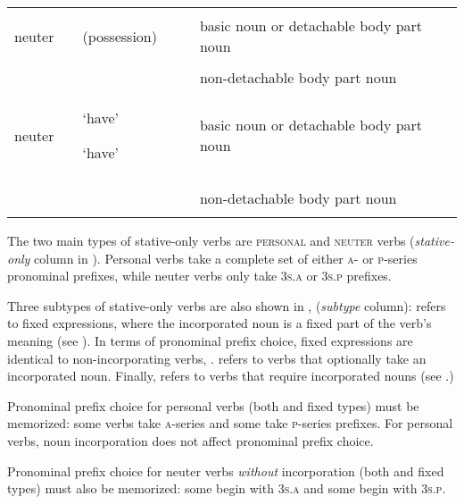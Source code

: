 \begin{table}
\begin{tabularx}{\textwidth}{lcQQQQ}

& 


\\
\addlinespace
\midrule
neuter &  &  

(possession) &   &  & {basic noun or detachable body part noun}\\
&&&&&\\
&  &  &  &  & {non-detachable body part noun}\\
\addlinespace
\midrule
neuter &  &   ‘have’

 ‘have’ &  &  & {basic noun or detachable body part noun}\\
&&&&&\\
&  &  &  &  & {non-detachable body part noun}\\
\lspbottomrule
\end{tabularx}
\end{table}

The two main types of stative-only verbs are \textsc{personal} and \textsc{neuter} verbs (\textit{stative-only} column in ). Personal verbs take a complete set of either \textsc{a}- or \textsc{p}-series pronominal prefixes, while neuter verbs only take  \textsc{3s.a} or  \textsc{3s.p} prefixes.

Three subtypes of stative-only verbs are also shown in , (\textit{subtype} column):  refers to fixed expressions, where the incorporated noun is a fixed part of the verb’s meaning (see ). In terms of pronominal prefix choice,  fixed expressions are identical to non-incorporating verbs, .  refers to verbs that optionally take an incorporated noun. Finally,  refers to verbs that require incorporated nouns (see .)

Pronominal prefix choice for personal verbs (both  and fixed  types) must be memorized: some verbs take \textsc{a}-series and some take \textsc{p}-series prefixes. For personal verbs, noun incorporation does not affect pronominal prefix choice. 

Pronominal prefix choice for neuter verbs \emph{without} incorporation (both  and fixed  types) must also  be memorized: some begin with  \textsc{3s.a} and some begin with  \textsc{3s.p}.


